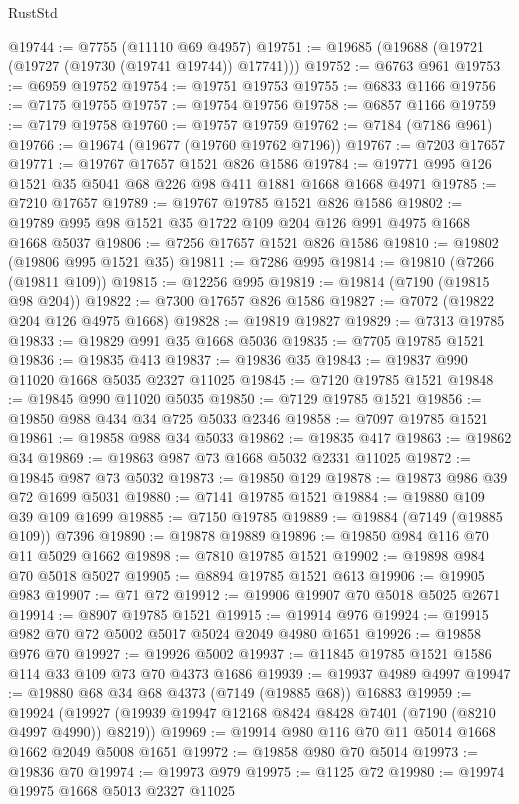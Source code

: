 \begin{lexlean}{RustStd}
\begin{coremodule}
@19744 := @7755 (@11110 @69 @4957)
@19751 := @19685 (@19688 (@19721 (@19727 (@19730 (@19741 @19744)) @17741)))
@19752 := @6763 @961
@19753 := @6959 @19752
@19754 := @19751 @19753
@19755 := @6833 @1166
@19756 := @7175 @19755
@19757 := @19754 @19756
@19758 := @6857 @1166
@19759 := @7179 @19758
@19760 := @19757 @19759
@19762 := @7184 (@7186 @961)
@19766 := @19674 (@19677 (@19760 @19762 @7196))
@19767 := @7203 @17657
@19771 := @19767 @17657 @1521 @826 @1586
@19784 := @19771 @995 @126 @1521 @35 @5041 @68 @226 @98 @411 @1881 @1668 @1668 @4971
@19785 := @7210 @17657
@19789 := @19767 @19785 @1521 @826 @1586
@19802 := @19789 @995 @98 @1521 @35 @1722 @109 @204 @126 @991 @4975 @1668 @1668 @5037
@19806 := @7256 @17657 @1521 @826 @1586
@19810 := @19802 (@19806 @995 @1521 @35)
@19811 := @7286 @995
@19814 := @19810 (@7266 (@19811 @109))
@19815 := @12256 @995
@19819 := @19814 (@7190 (@19815 @98 @204))
@19822 := @7300 @17657 @826 @1586
@19827 := @7072 (@19822 @204 @126 @4975 @1668)
@19828 := @19819 @19827
@19829 := @7313 @19785
@19833 := @19829 @991 @35 @1668 @5036
@19835 := @7705 @19785 @1521
@19836 := @19835 @413
@19837 := @19836 @35
@19843 := @19837 @990 @11020 @1668 @5035 @2327 @11025
@19845 := @7120 @19785 @1521
@19848 := @19845 @990 @11020 @5035
@19850 := @7129 @19785 @1521
@19856 := @19850 @988 @434 @34 @725 @5033 @2346
@19858 := @7097 @19785 @1521
@19861 := @19858 @988 @34 @5033
@19862 := @19835 @417
@19863 := @19862 @34
@19869 := @19863 @987 @73 @1668 @5032 @2331 @11025
@19872 := @19845 @987 @73 @5032
@19873 := @19850 @129
@19878 := @19873 @986 @39 @72 @1699 @5031
@19880 := @7141 @19785 @1521
@19884 := @19880 @109 @39 @109 @1699
@19885 := @7150 @19785
@19889 := @19884 (@7149 (@19885 @109)) @7396
@19890 := @19878 @19889
@19896 := @19850 @984 @116 @70 @11 @5029 @1662
@19898 := @7810 @19785 @1521
@19902 := @19898 @984 @70 @5018 @5027
@19905 := @8894 @19785 @1521 @613
@19906 := @19905 @983
@19907 := @71 @72
@19912 := @19906 @19907 @70 @5018 @5025 @2671
@19914 := @8907 @19785 @1521
@19915 := @19914 @976
@19924 := @19915 @982 @70 @72 @5002 @5017 @5024 @2049 @4980 @1651
@19926 := @19858 @976 @70
@19927 := @19926 @5002
@19937 := @11845 @19785 @1521 @1586 @114 @33 @109 @73 @70 @4373 @1686
@19939 := @19937 @4989 @4997
@19947 := @19880 @68 @34 @68 @4373 (@7149 (@19885 @68)) @16883
@19959 := @19924 (@19927 (@19939 @19947 @12168 @8424 @8428 @7401 (@7190 (@8210 @4997 @4990)) @8219))
@19969 := @19914 @980 @116 @70 @11 @5014 @1668 @1662 @2049 @5008 @1651
@19972 := @19858 @980 @70 @5014
@19973 := @19836 @70
@19974 := @19973 @979
@19975 := @1125 @72
@19980 := @19974 @19975 @1668 @5013 @2327 @11025

\end{coremodule}
\end{lexlean}
